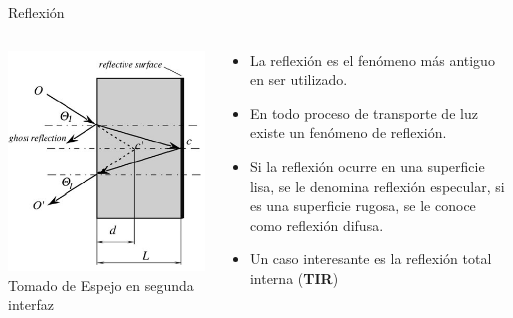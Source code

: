 \documentclass[aspectratio=169]{beamer}
\begin{document}
\begin{frame}{Reflexión}
    \begin{columns}[c, onlytextwidth]
    \begin{column}{0.45\textwidth}
            \centering
            \includegraphics[width = 0.9\linewidth]{fig/Optica/reflection.PNG}
            \tiny{Tomado de \cite{Fraden_2016}}
            \tiny{Espejo en segunda interfaz}
        \end{column}
        \begin{column}{0.55\textwidth}
            \begin{itemize}
                \item La reflexión es el fenómeno más antiguo en ser utilizado.
                \item En todo proceso de transporte de luz existe un fenómeno de reflexión.
                \item Si la reflexión ocurre en una superficie lisa, se le denomina reflexión especular, si es una superficie rugosa, se le conoce como reflexión difusa. 
                \item Un caso interesante es la reflexión total interna (\textbf{TIR})
            \end{itemize}
        \end{column}
    \end{columns}
\end{frame}
\end{document}
